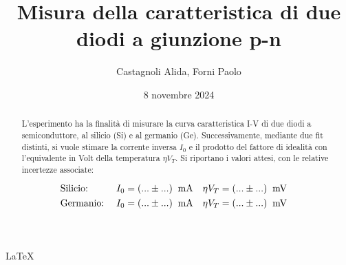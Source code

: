 \documentclass[11pt]{article}
\begin{document}
\LaTeX

\title{\textbf{Misura della caratteristica di due diodi a giunzione p-n}}
\author{Castagnoli Alida, Forni Paolo}
\date{8 novembre 2024}
\maketitle

\begin{abstract}
    L'esperimento ha la finalità di misurare la curva caratteristica \mbox{I-V} di due diodi a semiconduttore, al silicio (Si) e al germanio (Ge). 
    Successivamente, mediante due fit distinti, si vuole stimare la corrente inversa $I_{0}$ e il prodotto del fattore di idealità con l'equivalente in Volt della temperatura $\eta V_{T}$.  
    Si riportano i valori attesi, con le relative incertezze associate:

    \begin{align*}
        &\textnormal{Silicio:} \;
        &I_{0} &= (... \pm ...) \;\;\textnormal{mA} &
        \eta V_{T} &= (... \pm ...)\;\;\textnormal{mV} & \\
        &\textnormal{Germanio:} \;
        &I_{0} &= (... \pm ...) \;\;\textnormal{mA} &
        \eta V_{T} &= (... \pm ...)\;\;\textnormal{mV} &
    \end{align*}

\end{abstract}



\end{document}
